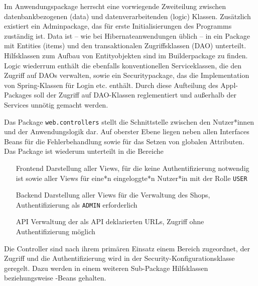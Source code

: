 Im Anwendungspackage herrscht eine vorwiegende Zweiteilung zwischen datenbankbezogenen (data) und datenverarbeitenden (logic) Klassen. Zusätzlich existiert ein Adminpackage, das für erste Initialisierungen des Programms zuständig ist. Data ist -- wie bei Hibernateanwendungen üblich -- in ein Package mit Entities (items) und den transaktionalen Zugriffsklassen (DAO) unterteilt. Hilfsklassen zum Aufbau von Entityobjekten sind im Builderpackage zu finden. Logic wiederrum enthält die ebenfalls konventionellen Serviceklassen, die den Zugriff auf DAOs verwalten, sowie ein Securitypackage, das die Implementation von Spring-Klassen für Login etc. enthält. Durch diese Aufteilung des Appl-Packages soll der Zugriff auf DAO-Klassen reglementiert und außerhalb der Services unnötig gemacht werden.

Das Package \lstinline|web.controllers| stellt die Schnittstelle zwischen den Nutzer*innen und der Anwendungslogik dar. Auf oberster Ebene liegen neben allen Interfaces Beans für die Fehlerbehandlung sowie für das Setzen von globalen Attributen. Das Package ist wiederum unterteilt in die Bereiche
\begin{itemize}
	\item[Frontend] Darstellung aller Views, für die keine Authentifizierung notwendig ist sowie aller Views für eine*n eingeloggte*n Nutzer*in mit der Rolle \lstinline|USER|
	\item[Backend] Darstellung aller Views für die Verwaltung des Shops, Authentifizierung als \lstinline|ADMIN| erforderlich
	\item[API] Verwaltung der als API deklarierten URLs, Zugriff ohne Authentifizierung möglich
\end{itemize}
Die Controller sind nach ihrem primären Einsatz einem Bereich zugeordnet, der Zugriff und die Authentifizierung wird in der Security-Konfigurationsklasse geregelt. Dazu werden in einem weiteren Sub-Package Hilfsklassen beziehungsweise -Beans gehalten.